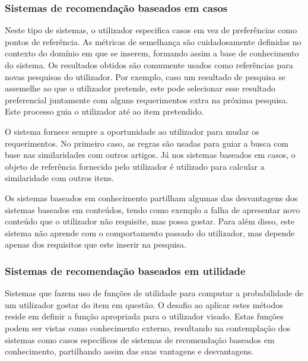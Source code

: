 \subsubsection{Sistemas de recomendação baseados em casos}
\par\hfill
\par Neste tipo de sistemas, o utilizador especifica casos em vez de preferências como pontos de referência. As métricas de semelhança são cuidadosamente definidas no contexto do domínio em que se inserem, formando assim a base de conhecimento do sistema. Os resultados obtidos são comumente usados como referências para novas pesquisas do utilizador. Por exemplo, caso um resultado de pesquisa se assemelhe ao que o utilizador pretende, este pode selecionar esse resultado preferencial juntamente com alguns requerimentos extra na próxima pesquisa. Este processo guia o utilizador até ao item pretendido.
\par O sistema fornece sempre a oportunidade ao utilizador para mudar os requerimentos. No primeiro caso, as regras são usadas para guiar a busca com base nas similaridades com outros artigos. Já nos sistemas baseados em casos, o objeto de referência fornecido pelo utilizador é utilizado para calcular a similaridade com outros itens.
\par Os sistemas baseados em conhecimento partilham algumas das desvantagens
dos sistemas baseados em conteúdos, tendo como exemplo a falha de apresentar novo conteúdo que o utilizador não requisite, mas possa gostar. Para além disso, este sistema não aprende com o comportamento passado do utilizador, mas depende apenas dos requisitos que este inserir na pesquisa.



\subsubsection{Sistemas de recomendação baseados em utilidade}
\par\hfill
\par Sistemas que fazem uso de funções de utilidade para computar a probabilidade de um utilizador gostar do item em questão.
O desafio ao aplicar estes métodos reside em definir a função apropriada para o utilizador visado. Estas funções podem ser vistas como conhecimento externo, resultando na contemplação dos sistemas como casos específicos de sistemas de recomendação baseados em conhecimento, partilhando assim das suas vantagens e desvantagens.
\hfill

